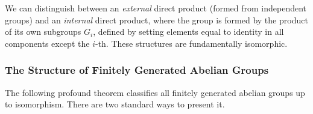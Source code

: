 We can distinguish between an \textit{external} direct product (formed from independent groups) and an \textit{internal} direct product, where the group is formed by the product of its own subgroups $G_i$, defined by setting elements equal to identity in all components except the $i$-th. These structures are fundamentally isomorphic.



\subsubsection{The Structure of Finitely Generated Abelian Groups}

The following profound theorem classifies all finitely generated abelian groups up to isomorphism. There are two standard ways to present it.


